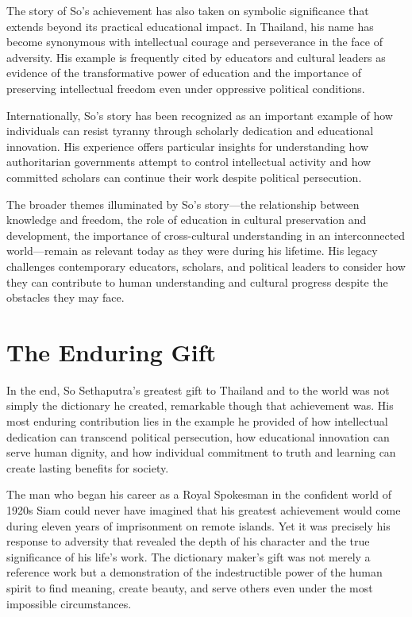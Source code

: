 \documentclass[
  Letterpaper,
]{scrbook}
\begin{document}
The story of So's achievement has also taken on symbolic significance
that extends beyond its practical educational impact. In Thailand, his
name has become synonymous with intellectual courage and perseverance in
the face of adversity. His example is frequently cited by educators and
cultural leaders as evidence of the transformative power of education
and the importance of preserving intellectual freedom even under
oppressive political conditions.

Internationally, So's story has been recognized as an important example
of how individuals can resist tyranny through scholarly dedication and
educational innovation. His experience offers particular insights for
understanding how authoritarian governments attempt to control
intellectual activity and how committed scholars can continue their work
despite political persecution.

The broader themes illuminated by So's story---the relationship between
knowledge and freedom, the role of education in cultural preservation
and development, the importance of cross-cultural understanding in an
interconnected world---remain as relevant today as they were during his
lifetime. His legacy challenges contemporary educators, scholars, and
political leaders to consider how they can contribute to human
understanding and cultural progress despite the obstacles they may face.

\section{The Enduring Gift}\label{the-enduring-gift}

In the end, So Sethaputra's greatest gift to Thailand and to the world
was not simply the dictionary he created, remarkable though that
achievement was. His most enduring contribution lies in the example he
provided of how intellectual dedication can transcend political
persecution, how educational innovation can serve human dignity, and how
individual commitment to truth and learning can create lasting benefits
for society.

The man who began his career as a Royal Spokesman in the confident world
of 1920s Siam could never have imagined that his greatest achievement
would come during eleven years of imprisonment on remote islands. Yet it
was precisely his response to adversity that revealed the depth of his
character and the true significance of his life's work. The dictionary
maker's gift was not merely a reference work but a demonstration of the
indestructible power of the human spirit to find meaning, create beauty,
and serve others even under the most impossible circumstances.
\end{document}

